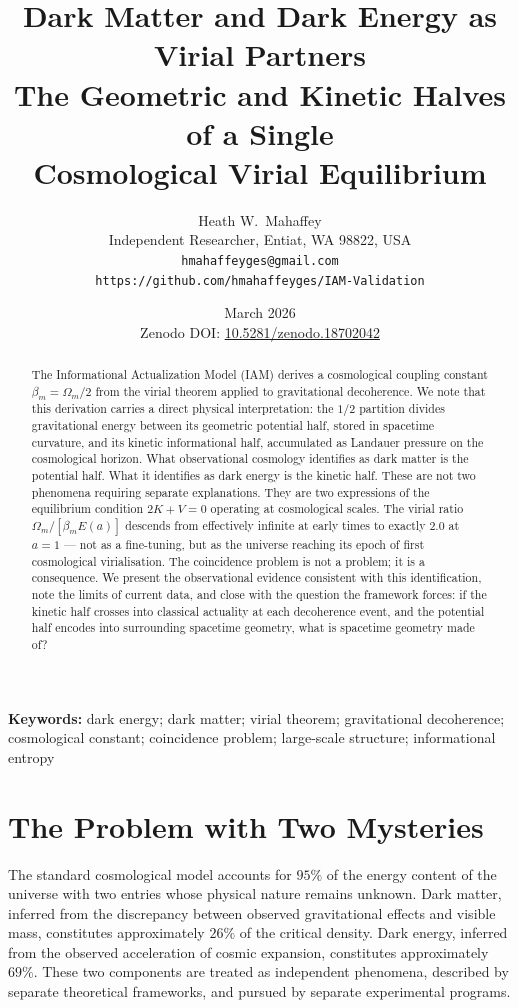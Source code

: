 \documentclass[12pt,a4paper]{article}
\title{\textbf{Dark Matter and Dark Energy as Virial Partners}\\
\large The Geometric and Kinetic Halves of a Single\\
Cosmological Virial Equilibrium}
\author{Heath W.\ Mahaffey\\
\small Independent Researcher, Entiat, WA 98822, USA\\
\small \texttt{hmahaffeyges@gmail.com}\\
\small \texttt{https://github.com/hmahaffeyges/IAM-Validation}}
\date{March 2026\\
\small Zenodo DOI: \href{https://doi.org/10.5281/zenodo.18702042}{10.5281/zenodo.18702042}}
\begin{document}
\maketitle

\begin{abstract}
The Informational Actualization Model (IAM) derives a cosmological coupling
constant $\beta_m = \Omega_m/2$ from the virial theorem applied to
gravitational decoherence. We note that this derivation carries a direct
physical interpretation: the $1/2$ partition divides gravitational energy
between its geometric potential half, stored in spacetime curvature, and its
kinetic informational half, accumulated as Landauer pressure on the
cosmological horizon. What observational cosmology identifies as dark matter is
the potential half. What it identifies as dark energy is the kinetic half.
These are not two phenomena requiring separate explanations. They are two
expressions of the equilibrium condition $2K + V = 0$ operating at
cosmological scales. The virial ratio $\Omega_m / [\beta_m E(a)]$ descends
from effectively infinite at early times to exactly $2.0$ at $a = 1$ --- not
as a fine-tuning, but as the universe reaching its epoch of first
cosmological virialisation. The coincidence problem is not a problem; it is a
consequence. We present the observational evidence consistent with this
identification, note the limits of current data, and close with the question
the framework forces: if the kinetic half crosses into classical actuality at
each decoherence event, and the potential half encodes into surrounding
spacetime geometry, what is spacetime geometry made of?
\end{abstract}

\noindent\textbf{Keywords:} dark energy; dark matter; virial theorem; 
gravitational decoherence; cosmological constant; coincidence problem;
large-scale structure; informational entropy

\section{The Problem with Two Mysteries}
\label{sec:two_mysteries}

The standard cosmological model accounts for $95\%$ of the energy content of
the universe with two entries whose physical nature remains unknown. Dark
matter, inferred from the discrepancy between observed gravitational effects
and visible mass, constitutes approximately $26\%$ of the critical density.
Dark energy, inferred from the observed acceleration of cosmic expansion,
constitutes approximately $69\%$. These two components are treated as
independent phenomena, described by separate theoretical frameworks, and
pursued by separate experimental programs.
\end{document}

